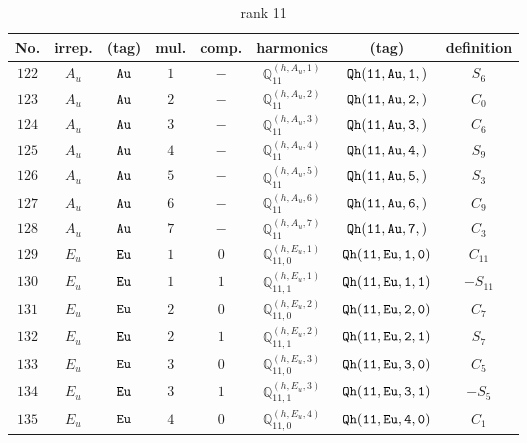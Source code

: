 \documentclass[fleqn,8pt]{jsarticle}
\begin{document}
\begin{table}[ht!]
\begin{center}
\caption{rank 11}
\renewcommand{\arraystretch}{1.3}
\begin{tabular}{cccccccc} \hline \hline
No. & irrep. & (tag) & mul. & comp. & harmonics & (tag) & definition \\ \hline
$ 122 $ & $ A_{u} $ & $ {\tt Au} $ & $ 1 $ & $ - $ & $ \mathbb{Q}_{11}^{(h,A_{u},1)} $ & $ {\tt Qh(11,Au,1,)} $ & $ S_{6} $ \\
$ 123 $ & $ A_{u} $ & $ {\tt Au} $ & $ 2 $ & $ - $ & $ \mathbb{Q}_{11}^{(h,A_{u},2)} $ & $ {\tt Qh(11,Au,2,)} $ & $ C_{0} $ \\
$ 124 $ & $ A_{u} $ & $ {\tt Au} $ & $ 3 $ & $ - $ & $ \mathbb{Q}_{11}^{(h,A_{u},3)} $ & $ {\tt Qh(11,Au,3,)} $ & $ C_{6} $ \\
$ 125 $ & $ A_{u} $ & $ {\tt Au} $ & $ 4 $ & $ - $ & $ \mathbb{Q}_{11}^{(h,A_{u},4)} $ & $ {\tt Qh(11,Au,4,)} $ & $ S_{9} $ \\
$ 126 $ & $ A_{u} $ & $ {\tt Au} $ & $ 5 $ & $ - $ & $ \mathbb{Q}_{11}^{(h,A_{u},5)} $ & $ {\tt Qh(11,Au,5,)} $ & $ S_{3} $ \\
$ 127 $ & $ A_{u} $ & $ {\tt Au} $ & $ 6 $ & $ - $ & $ \mathbb{Q}_{11}^{(h,A_{u},6)} $ & $ {\tt Qh(11,Au,6,)} $ & $ C_{9} $ \\
$ 128 $ & $ A_{u} $ & $ {\tt Au} $ & $ 7 $ & $ - $ & $ \mathbb{Q}_{11}^{(h,A_{u},7)} $ & $ {\tt Qh(11,Au,7,)} $ & $ C_{3} $ \\
$ 129 $ & $ E_{u} $ & $ {\tt Eu} $ & $ 1 $ & $ 0 $ & $ \mathbb{Q}_{11,0}^{(h,E_{u},1)} $ & $ {\tt Qh(11,Eu,1,0)} $ & $ C_{11} $ \\
$ 130 $ & $ E_{u} $ & $ {\tt Eu} $ & $ 1 $ & $ 1 $ & $ \mathbb{Q}_{11,1}^{(h,E_{u},1)} $ & $ {\tt Qh(11,Eu,1,1)} $ & $ - S_{11} $ \\
$ 131 $ & $ E_{u} $ & $ {\tt Eu} $ & $ 2 $ & $ 0 $ & $ \mathbb{Q}_{11,0}^{(h,E_{u},2)} $ & $ {\tt Qh(11,Eu,2,0)} $ & $ C_{7} $ \\
$ 132 $ & $ E_{u} $ & $ {\tt Eu} $ & $ 2 $ & $ 1 $ & $ \mathbb{Q}_{11,1}^{(h,E_{u},2)} $ & $ {\tt Qh(11,Eu,2,1)} $ & $ S_{7} $ \\
$ 133 $ & $ E_{u} $ & $ {\tt Eu} $ & $ 3 $ & $ 0 $ & $ \mathbb{Q}_{11,0}^{(h,E_{u},3)} $ & $ {\tt Qh(11,Eu,3,0)} $ & $ C_{5} $ \\
$ 134 $ & $ E_{u} $ & $ {\tt Eu} $ & $ 3 $ & $ 1 $ & $ \mathbb{Q}_{11,1}^{(h,E_{u},3)} $ & $ {\tt Qh(11,Eu,3,1)} $ & $ - S_{5} $ \\
$ 135 $ & $ E_{u} $ & $ {\tt Eu} $ & $ 4 $ & $ 0 $ & $ \mathbb{Q}_{11,0}^{(h,E_{u},4)} $ & $ {\tt Qh(11,Eu,4,0)} $ & $ C_{1} $ \\

\end{tabular}
\end{center}
\end{table}
\end{document}
